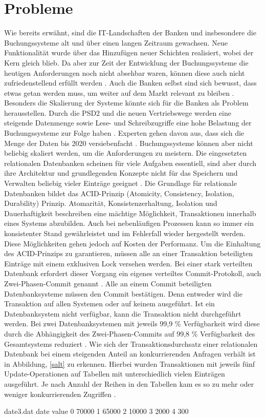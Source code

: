 \documentclass[12pt,oneside,a4paper,parskip]{scrbook}
\begin{document}
\section{Probleme}
\label{problems}
Wie bereits erwähnt, sind die IT-Landschaften der Banken und insbesondere die Buchungssysteme alt und über einen langen Zeitraum gewachsen. Neue Funktionalität wurde über das Hinzufügen neuer Schichten realisiert, wobei der Kern gleich blieb. Da aber zur Zeit der Entwicklung der Buchungssysteme die heutigen Anforderungen noch nicht absehbar waren, können diese auch nicht zufriedenstellend erfüllt werden \cite[23-27]{ITidF}\cite{bankEnzy}. Auch die Banken selbst sind sich bewusst, dass etwas getan werden muss, um weiter auf dem Markt relevant zu bleiben \cite{capgemini}.
Besonders die Skalierung der Systeme könnte sich für die Banken als Problem herausstellen. Durch die PSD2 und die neuen Vertriebswege werden eine steigende Datenmenge sowie Lese- und Schreibzugriffe eine hohe Belastung der Buchungssysteme zur Folge haben \cite{bigdataBigStorage}. Experten gehen davon aus, dass sich die Menge der Daten bis 2020 versiebenfacht \cite{versiebenfacht}. Buchungssysteme können aber nicht beliebig skaliert werden, um die Anforderungen zu meistern. Die eingesetzten relationalen Datenbanken scheinen für viele Aufgaben essentiell, sind aber durch ihre Architektur und grundlegenden Konzepte nicht für das Speichern und Verwalten beliebig vieler Einträge geeignet \cite{rdbmsBigData}. Die Grundlage für relationale Datenbanken bildet das ACID-Prinzip (Atomicity, Consistency, Isolation, Durability) Prinzip. Atomarität, Konsistenzerhaltung, Isolation und Dauerhaftigkeit beschreiben eine mächtige Möglichkeit, Transaktionen innerhalb eines Systems abzubilden. Auch bei nebenläufigen Prozessen kann so immer ein konsistenter Stand gewährleistet und im Fehlerfall wieder hergestellt werden. Diese Möglichkeiten gehen jedoch auf Kosten der Performanz. Um die Einhaltung des ACID-Prinzips zu garantieren, müssen alle an einer Transaktion beteiligten Einträge mit einem exklusiven Lock versehen werden. Bei einer stark verteilten Datenbank erfordert dieser Vorgang ein eigenes verteiltes Commit-Protokoll, auch Zwei-Phasen-Commit genannt \cite{dbarchitecture}. Alle an einem Commit beteiligten Datenbanksysteme müssen den Commit bestätigen. Denn entweder wird die Transaktion auf allen Systemen oder auf keinem ausgeführt. Ist ein Datenbanksystem nicht verfügbar, kann die Transaktion nicht durchgeführt werden. Bei zwei Datenbanksystemen mit jeweils 99,9 \% Verfügbarkeit wird diese durch die Abhängigkeit des Zwei-Phasen-Commits auf 99,8 \% Verfügbarkeit des Gesamtsystems reduziert \cite{BASE}. Wie sich der Transaktionsdurchsatz einer relationalen Datenbank bei einem steigenden Anteil an konkurrierenden Anfragen verhält ist in Abbildung, \ref{salt} zu erkennen. Hierbei wurden Transaktionen mit jeweils fünf Update-Operationen auf Tabellen mit unterschiedlich vielen Einträgen ausgeführt. Je nach Anzahl der Reihen in den Tabellen kam es so zu mehr oder weniger konkurrierenden Zugriffen \cite{salt}.
\begin{filecontents}{date3.dat}
date  value
0     70000
1     65000
2     10000
3     2000
4     300
\end{filecontents}
\end{document}
